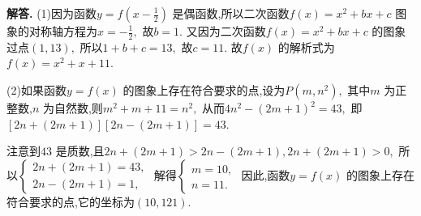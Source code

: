 \documentclass[12pt,a4paper,oneside]{ctexart}
\newenvironment{solution}{\par\noindent\textbf{解答. }}{\\\par}
\begin{document}
\begin{solution}
    (1)因为函数$ y=f(x-\frac{1}{2}) $ 是偶函数,所以二次函数$ f(x)=x^2+bx+c $ 图象的对称轴方程为$ x=-\frac{1}{2}, $ 故$ b=1. $ 又因为二次函数$ f(x)=x^2+bx+c $ 的图象过点$ (1,13), $ 所以$ 1+b+c=13, $ 故$ c=11. $ 故$ f(x) $ 的解析式为$ f(x)=x^2+x+11. $ 

    (2)如果函数$ y=f(x) $ 的图象上存在符合要求的点,设为$ P(m,n^2), $ 其中$ m $ 为正整数,$ n $ 为自然数,则$ m^2+m+11=n^2, $ 从而$ 4n^2-(2m+1)^2=43, $ 即$ [2n+(2m+1)][2n-(2m+1)]=43. $ 

    注意到$ 43 $ 是质数,且$ 2n+(2m+1)>2n-(2m+1),2n+(2m+1)>0, $ 所以$ \begin{cases}
        2n+(2m+1)=43,\\
        2n-(2m+1)=1,
    \end{cases} $ 解得$ \begin{cases}
        m=10,\\
        n=11.
    \end{cases} $ 
    因此,函数$ y=f(x) $ 的图象上存在符合要求的点,它的坐标为$ (10,121). $ 
\end{solution}
\end{document}
